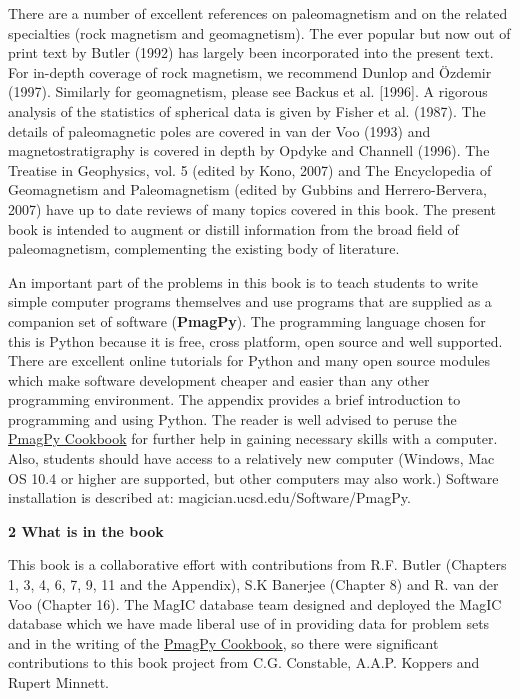 There are a number of excellent references on paleomagnetism and on the related
specialties (rock magnetism and geomagnetism).    The ever popular but now out of print text  by Butler (1992) has largely been incorporated into the present text.  
 For in-depth coverage of
rock magnetism, we recommend Dunlop and \"Ozdemir (1997).  Similarly for
geomagnetism, please see Backus et al. [1996].  A rigorous analysis of 
the statistics of spherical data is given by Fisher et al. (1987).  The details
of paleomagnetic poles are covered in van der Voo (1993) and
magnetostratigraphy is covered in depth by Opdyke and Channell (1996).  The Treatise in Geophysics, vol. 5  (edited by Kono, 2007) \nocite{kono07b} and The Encyclopedia of Geomagnetism and Paleomagnetism (edited by Gubbins and Herrero-Bervera, 2007) \nocite{gubbins07} have  up to date reviews of many topics covered in this book.  
The present book is intended to augment or distill information from the broad field of
paleomagnetism, complementing the existing body of literature.
\nocite{mcelhinny00,dunlop97,backus96,fisher87,voo93,opdyke96} 

An important part of the  problems in this book  is to teach students to  write simple computer programs themselves and use programs that are supplied 
as a companion set of software ({\bf PmagPy}).   The programming language chosen for this is Python because
it is free, cross platform, open source and well supported.   There are excellent online tutorials for Python and many open source modules which make software development cheaper and easier than any other programming environment.  The appendix provides a brief introduction to programming and using Python.  The reader is well advised to peruse the  \href{http://earthref.org/PmagPy/cookbook/}{PmagPy Cookbook} for further help in gaining necessary skills with a computer.    Also, students should have access to a relatively new computer (Windows, Mac OS 10.4 or higher are supported, but other computers may also work.)  Software installation is described at:  magician.ucsd.edu/Software/PmagPy.





\noindent
{\bf 2 What is in the book}



This book is a collaborative effort with contributions from R.F. Butler (Chapters 1, 3, 4, 6, 7, 9, 11 and the Appendix),  S.K Banerjee (Chapter 8) and R. van der Voo (Chapter 16).  The MagIC database team designed and deployed the MagIC database which we have made liberal use of in providing  data for problem sets and in the writing of  the \href{http://earthref.org/PmagPy/cookbook/}{PmagPy Cookbook},  so there were significant contributions to this book project from C.G.  Constable,  A.A.P. Koppers and Rupert Minnett.  


